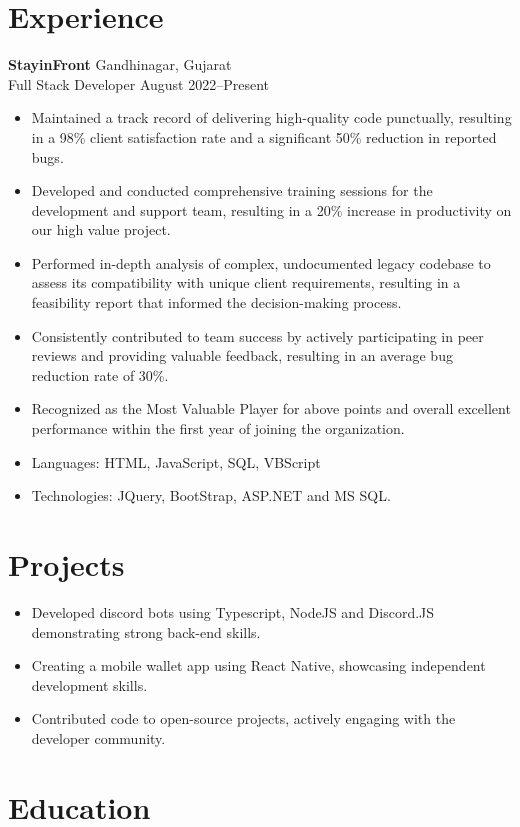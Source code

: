 \documentclass[a4paper,10pt]{article}
\begin{document}
\section{Experience}
\noindent
\textbf{StayinFront} \hfill Gandhinagar, Gujarat \\
Full Stack Developer \hfill August 2022--Present \
\begin{itemize}
    \item Maintained a track record of delivering high-quality code punctually, resulting in a 98\% client satisfaction rate and a significant 50\% reduction in reported bugs.
    \item Developed and conducted comprehensive training sessions for the development and support team, resulting in a 20\% increase in productivity on our high value project.
    \item Performed in-depth analysis of complex, undocumented legacy codebase to assess its compatibility with unique client requirements, resulting in a feasibility report that informed the decision-making process.
    \item Consistently contributed to team success by actively participating in peer reviews and providing valuable feedback, resulting in an average bug reduction rate of 30\%.
    \item Recognized as the Most Valuable Player for above points and overall excellent performance within the first year of joining the organization.
    \item Languages: HTML, JavaScript, SQL, VBScript
    \item Technologies: JQuery, BootStrap, ASP.NET and MS SQL\@.
\end{itemize}

\section{Projects}
\begin{itemize}
    \item Developed discord bots using Typescript, NodeJS and Discord.JS demonstrating strong back-end skills.
    \item Creating a mobile wallet app using React Native, showcasing independent development skills.
    \item Contributed code to open-source projects, actively engaging with the developer community.
\end{itemize}

\section{Education}
\end{document}
